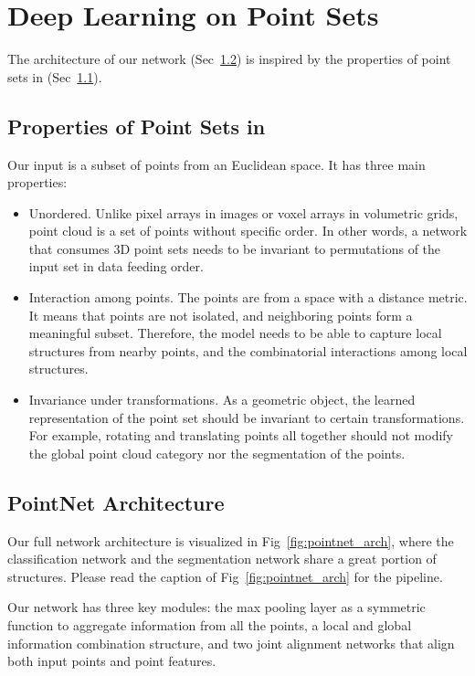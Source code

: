 \documentclass[10pt,twocolumn,letterpaper]{article}
\newcommand{\denselist}{\itemsep 0pt\parsep=0pt\partopsep 0pt\vspace{-2pt}}
\newcommand{\bitem}{\begin{itemize}\denselist}
\newcommand{\eitem}{\end{itemize}}
\begin{document}
 
\section{Deep Learning on Point Sets}
The architecture of our network (Sec~\ref{sec:pointnet_arch}) is inspired by the properties of point sets in  (Sec~\ref{sec:point_set_property}). 

\subsection{Properties of Point Sets in }
\label{sec:point_set_property}
Our input is a subset of points from an Euclidean space. It has three main properties:

\bitem
\item Unordered.
Unlike pixel arrays in images or voxel arrays in volumetric grids, point cloud is a set of points without specific order. In other words, a network that consumes  3D point sets needs to be invariant to  permutations of the input set in data feeding order. 
\item Interaction among points. The points are from a space with a distance metric. It means that points are not isolated, and neighboring points form a meaningful subset. Therefore, the model needs to be able to capture local structures from nearby points, and the combinatorial interactions among local structures. 
\item Invariance under transformations.
As a geometric object, the learned representation of the point set should be invariant to certain transformations. For example, rotating and translating points all together should not modify the global point cloud category nor the segmentation of the points.
\eitem





\subsection{PointNet Architecture}
\label{sec:pointnet_arch}

Our full network architecture is visualized in Fig~\ref{fig:pointnet_arch}, where the classification network and the segmentation network share a great portion of structures. Please read the caption of Fig~\ref{fig:pointnet_arch} for the pipeline.

Our network has three key modules: the max pooling layer as a symmetric function to aggregate information from all the points, a local and global information combination structure, and two joint alignment networks that align both input points and point features.
\end{document}
